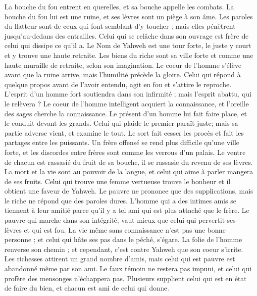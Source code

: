 \begin{multicols}{2}
La bouche du fou entrent en querelles, et sa bouche appelle les combats.
La bouche du fou lui est une ruine, et ses lèvres sont un piège à son âme.
Les paroles du flatteur sont de ceux qui font semblant d'y toucher ; mais elles pénètrent jusqu'au-dedans des entrailles.
Celui qui se relâche dans son ouvrage est frère de celui qui dissipe ce qu'il a.
Le Nom de Yahweh est une tour forte, le juste y court et y trouve une haute retraite.
Les biens du riche sont sa ville forte et comme une haute muraille de retraite, selon son imagination.
Le coeur de l'homme s'élève avant que la ruine arrive, mais l'humilité précède la gloire.
Celui qui répond à quelque propos avant de l'avoir entendu, agit en fou et s'attire le reproche.
L'esprit d'un homme fort soutiendra dans son infirmité ; mais l'esprit abattu, qui le relèvera ?
Le coeur de l'homme intelligent acquiert la connaissance, et l'oreille des sages cherche la connaissance.
Le présent d'un homme lui fait faire place, et le conduit devant les grands.
Celui qui plaide le premier paraît juste; mais sa partie adverse vient, et examine le tout.
Le sort fait cesser les procès et fait les partages entre les puissants.
Un frère offensé se rend plus difficile qu'une ville forte, et les discordes entre frères sont comme les verrous d'un palais.
Le ventre de chacun est rassasié du fruit de sa bouche, il se rassasie du revenu de ses lèvres.
La mort et la vie sont au pouvoir de la langue, et celui qui aime à parler mangera de ses fruits.
Celui qui trouve une femme vertueuse trouve le bonheur et il obtient une faveur de Yahweh.
Le pauvre ne prononce que des supplications, mais le riche ne répond que des paroles dures.
L'homme qui a des intimes amis se tiennent à leur amitié parce qu'il y a tel ami qui est plus attaché que le frère.
\VerseOne{}Le pauvre qui marche dans son intégrité, vaut mieux que celui qui pervertit ses lèvres et qui est fou.
La vie même sans connaissance n'est pas une bonne personne ; et celui qui hâte ses pas dans le péché, s'égare.
La folie de l'homme renverse son chemin ; et cependant, c'est contre Yahweh que son coeur s'irrite.
Les richesses attirent un grand nombre d'amis, mais celui qui est pauvre est abandonné même par son ami.
Le faux témoin ne restera pas impuni, et celui qui profère des mensonges n'échappera pas.
Plusieurs supplient celui qui est en état de faire du bien, et chacun est ami de celui qui donne.

\end{multicols}
